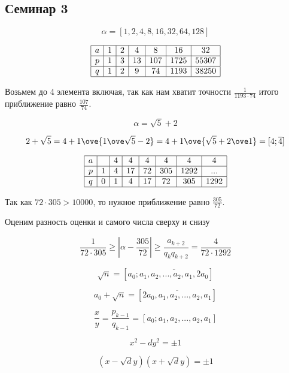 \subsection{Семинар 3}



\[\alpha = [1, 2, 4, 8, 16, 32, 64, 128]\]

\[\begin{array}{|c|c|c|c|c|c|c|}
    \hline
    a & 1 & 2 & 4 & 8  & 16 & 32\\
    \hline
    p & 1 & 3 & 13& 107& 1725&55307\\
    \hline
    q & 1 & 2 & 9 & 74 & 1193& 38250\\
    \hline
\end{array}\]

Возьмем до 4 элемента включая, так как нам хватит точности $\frac{1}{1193 \cdot 74}$ итого приближение равно $\frac{107}{74}$.


\[\alpha = \sqrt{5} + 2\]

\[2+ \sqrt{5} = 4 + {1 \ove {1 \ove \sqrt{5} - 2}} = 4 + {1 \ove {\sqrt{5} + 2 \ove 1}} = [4; \overline{4}]\]

\[\begin{array}{|c|c|c|c|c|c|c|c|}
    \hline
    a &  &  4 & 4 & 4 & 4 & 4 & 4\\
    \hline
    p & 1 & 4 & 17& 72& 305&1292 & ...\\
    \hline
    q & 0 & 1 & 4 & 17 & 72& 305 & 1292\\
    \hline
\end{array}\]

Так как $72 \cdot 305 > 10000$, то нужное приближение равно $\frac{305}{72}$.

Оценим разность оценки и самого числа сверху и снизу

\[\frac{1}{72 \cdot 305} \geq |\alpha - \frac{305}{72}| \geq \frac{a_{k + 2}}{q_k q_{k + 2}} = \frac{4}{72 \cdot 1292}\]


\[\sqrt{n} = [a_0; \overline{a_1, a_2, ..., a_2, a_1, 2a_0}]\]

\[a_0 + \sqrt{n} = [\overline{2a_0, a_1, a_2, ..., a_2, a_1}]\]

\[\frac{x}{y} = \frac{p_{k - 1}}{q_{k - 1}} = [a_0; a_1, a_2, ..., a_2, a_1]\]

\[x^2 -dy^2 = \pm 1\]

\[(x - \sqrt{d}y)(x + \sqrt{d}y) = \pm 1\]

